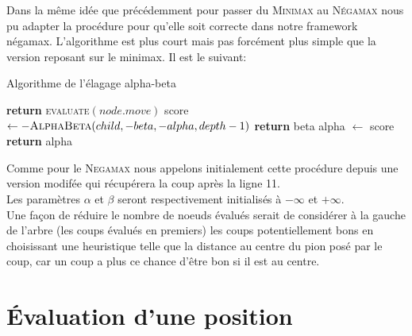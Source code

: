 \documentclass{article}
\begin{document}
\pagebreak
Dans la même idée que précédemment pour passer du \textsc{Minimax} au \textsc{Négamax} nous pu adapter la procédure pour qu'elle soit correcte dans
notre framework négamax. L'algorithme est plus court mais pas forcément plus simple que la version reposant sur le minimax. Il est le suivant:\\
\begin{algorithm}
\caption{Algorithme de l'élagage alpha-beta}\label{negamax}
\begin{algorithmic}[1]
		\State \textbf{return} \textsc{evaluate}$(node.move)$
	\EndIf
		\State score $\gets -\textsc{AlphaBeta}(child,-beta, -alpha, depth -1)$
			\State \textbf{return} beta
		\EndIf
			\State alpha $\gets$ score
		\EndIf
	\EndFor
	\State \textbf{return} alpha
\EndProcedure
\end{algorithmic}
\end{algorithm}

Comme pour le \textsc{Negamax} nous appelons initialement cette procédure depuis une version modifée qui récupérera la coup après la ligne 11.\\
Les paramètres $\alpha$ et $\beta$ seront respectivement initialisés à $-\infty$ et $+\infty$.\\
Une façon de réduire le nombre de noeuds évalués serait de considérer à la gauche de l'arbre (les coups évalués en premiers) les coups potentiellement
bons en choisissant une heuristique telle que la distance au centre du pion posé par le coup, car un coup a plus ce chance d'être bon si il est au centre.

\pagebreak
\section{Évaluation d'une position}
\end{document}
